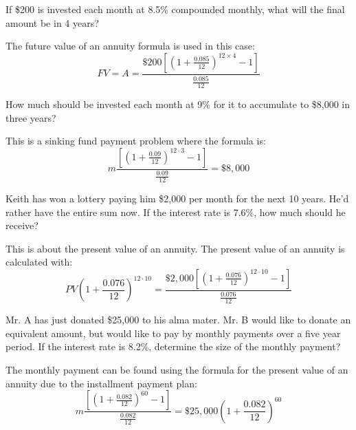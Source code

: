 \begin{example}
    If \$200 is invested each month at 8.5\% compounded monthly, what will the final amount be in 4 years?
\end{example}
\begin{solution}
    The future value of an annuity formula is used in this case:
    \[ FV = A = \frac{\$200 \left[\left(1 + \frac{0.085}{12}\right)^{12 \times 4} - 1\right]}{\frac{0.085}{12}} \]
\end{solution}

\begin{example}
    How much should be invested each month at 9\% for it to accumulate to \$8,000 in three years?
\end{example}
\begin{solution}
    This is a sinking fund payment problem where the formula is:
    \[ m \frac{\left[\left(1 + \frac{0.09}{12}\right)^{12 \cdot 3} - 1\right]}{\frac{0.09}{12}} = \$8,000 \]
\end{solution}

\begin{example}
    Keith has won a lottery paying him \$2,000 per month for the next 10 years. He'd rather have the entire sum now. If the interest rate is 7.6\%, how much should he receive?
\end{example}
\begin{solution}
    This is about the present value of an annuity. The present value of an annuity is calculated with:
    \[ PV\left(1 + \frac{0.076}{12}\right)^{12 \cdot 10} = \frac{\$2,000 \left[\left(1 + \frac{0.076}{12}\right)^{12 \cdot 10} - 1\right]}{\frac{0.076}{12}} \]
\end{solution}

\begin{example}
    Mr. A has just donated \$25,000 to his alma mater. Mr. B would like to donate an equivalent amount, but would like to pay by monthly payments over a five year period. If the interest rate is 8.2\%, determine the size of the monthly payment?
\end{example}
\begin{solution}
    The monthly payment can be found using the formula for the present value of an annuity due to the installment payment plan:
    \[ m\frac{\left[(1 + \frac{0.082}{12})^{60} - 1\right]}{\frac{0.082}{12}} = \$25,000\left(1 + \frac{0.082}{12}\right)^{60} \]
\end{solution}
